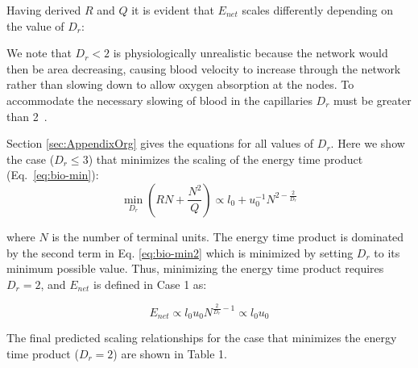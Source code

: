 \documentclass[12pt]{article}
\begin{document}
Having derived $R$ and $Q$ it is evident that $E_{net}$ scales differently
depending on the value of $D_r$:

\begin{caseof}

\end{caseof}
\noindent We note that $D_r < 2$ is physiologically unrealistic because the network would
then be area decreasing, causing blood velocity to increase through the network
rather than slowing down to allow oxygen absorption at the nodes. To
accommodate the necessary slowing of blood in the capillaries $D_r$ must be
greater than 2~\cite{west97}.

Section \ref{sec:AppendixOrg} gives the equations
for all values of $D_r$. Here we show the case ($D_r \leq 3$) that minimizes
the scaling of the energy time product (Eq.~\ref{eq:bio-min}):
\begin{equation}
  \min_{D_r} (RN + \frac{N^2}{Q})
  \propto l_0 + u_0^{-1}N^{2-\frac{2}{D_r}}
\label{eq:bio-min2}
\end{equation}

\noindent where $N$ is the number of terminal units.  The energy time product is dominated by the second term in Eq.
\ref{eq:bio-min2} which is minimized by setting $D_r$ to its minimum possible
value. Thus, minimizing the energy time product requires $D_r = 2$, and 
 $E_{net}$ is defined in Case 1 as: 

\begin{equation}
E_{net} \propto l_0 u_0 N^{\frac{2}{D_r}-1} \propto l_0 u_0
\label{eq:EnetOrg}
\end{equation}


\noindent The final predicted scaling relationships for the case that minimizes the energy time product ($D_r = 2$) are shown in Table 1.
\end{document}
